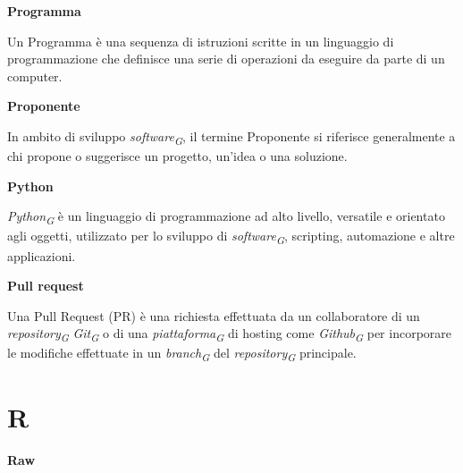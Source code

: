 \documentclass{article}
\begin{document}
\vspace{0.4cm}

\textbf{Programma}

\vspace{0.1cm}

Un Programma è una sequenza di istruzioni scritte in un linguaggio di programmazione che definisce una serie di operazioni da eseguire da parte di un computer.

\vspace{0.4cm}

\textbf{Proponente}

\vspace{0.1cm}

In ambito di sviluppo \textit{software}\textsubscript{\textit{G}}, il termine Proponente si riferisce generalmente a chi propone o suggerisce un progetto, un'idea o una soluzione.

\vspace{0.4cm}

\textbf{Python}

\vspace{0.1cm}

\textit{Python}\textsubscript{\textit{G}} è un linguaggio di programmazione ad alto livello, versatile e orientato agli oggetti, utilizzato per lo sviluppo di \textit{software}\textsubscript{\textit{G}}, scripting, automazione e altre applicazioni.

\vspace{0.4cm}

\textbf{Pull request}

\vspace{0.1cm}

Una Pull Request (PR) è una richiesta effettuata da un collaboratore di un \textit{repository}\textsubscript{\textit{G}} \textit{Git}\textsubscript{\textit{G}} o di una \textit{piattaforma}\textsubscript{\textit{G}} di hosting come \textit{Github}\textsubscript{\textit{G}} per incorporare le modifiche effettuate in un \textit{branch}\textsubscript{\textit{G}} del \textit{repository}\textsubscript{\textit{G}} principale.

\pagebreak
\section*{R}
{}

\vspace{0.4cm}

\textbf{Raw}
\end{document}
